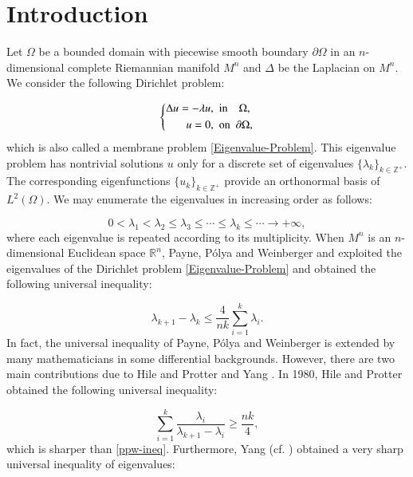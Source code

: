 \documentclass[12pt]{article}
\numberwithin{equation}{section}
\begin{document}
\section{Introduction}

Let
$\Omega$ be a bounded domain with piecewise smooth
boundary $\partial\Omega$ in an $n$-dimensional complete Riemannian manifold $M^{n}$ and $\Delta$ be the Laplacian on $M^{n}$. We consider the following Dirichlet problem:

\begin{equation}
\left\{ \begin{aligned} \label{Eigenvalue-Problem}\Delta u=-\lambda u,\ \ &{\rm
in}\ \ \ \ \Omega,
         \\
u=0,\ \ &{\rm on}\ \ \partial\Omega,
                          \end{aligned} \right.
                          \end{equation} which is also called a membrane problem \eqref{Eigenvalue-Problem}. This eigenvalue problem has nontrivial
solutions $u$ only for a discrete set of eigenvalues
$\{
\lambda_{k}
\}
_{k\in\mathbb{Z}^{+}}.$ The corresponding eigenfunctions
$\{u_{k}\}_{k\in\mathbb{Z}^{+}}$ provide an orthonormal  basis of $L^{2}(\Omega)$. We may enumerate
the eigenvalues in increasing order
as follows:

\begin{equation*}
0<\lambda_{1}<\lambda_{2}\leq\lambda_{3}\leq\cdots\leq\lambda_{k}\leq\cdots\rightarrow+\infty,
\end{equation*}
where each eigenvalue is repeated according to its multiplicity.
When $M^{n}$ is an $n$-dimensional Euclidean space $\mathbb{R}^{n}$, Payne,
P\'{o}lya and Weinberger \cite{PPW1} and \cite{PPW2} exploited the eigenvalues of the Dirichlet problem \eqref{Eigenvalue-Problem} and obtained the following universal inequality:

\begin{equation}\label{ppw-ineq}\lambda_{k+1}-\lambda_{k}\leq\frac{4}{nk}\sum^{k}_{i=1}\lambda_{i}.\end{equation}
In fact, the universal inequality of Payne, P\'{o}lya and Weinberger is extended  by many mathematicians in some differential backgrounds. However,
there are two main contributions due to Hile and Protter \cite{HP} and
Yang \cite{Y}. In 1980, Hile and Protter \cite{HP} obtained the following universal inequality:

\begin{equation}\label{hp-ineq}\sum^{k}_{i=1}\frac{\lambda_{i}}{\lambda_{k+1}-\lambda_{i}}\geq\frac{nk}{4},\end{equation}
which is sharper than \eqref{ppw-ineq}. Furthermore, Yang \cite{Y} (cf. \cite{CY1}) obtained a very sharp universal inequality of eigenvalues:
\end{document}
